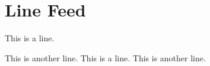 \documentclass{article}
\begin{document}
    \section{Line Feed}
        This is a line. 

        This is another line. \newline
        This is a line. \newline
        This is another line. 
        
\end{document}
